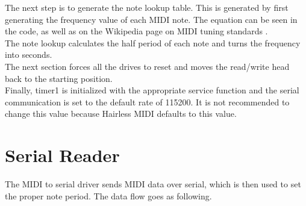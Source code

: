 \documentclass[11pt, a4paper]{report}
\begin{document}


The next step is to generate the note lookup table. This is generated by first generating the frequency value of each MIDI note. The equation can be seen in the code, as well as on the Wikipedia page on MIDI tuning standards \cite{MIDIStandard}.  \\




The note lookup calculates the half period of each note and turns the frequency into seconds. \\



The next section forces all the drives to reset and moves the read/write head back to the starting position. \\



Finally, timer1 is initialized with the appropriate service function and the serial communication is set to the default rate of 115200. It is not recommended to change this value because Hairless MIDI defaults to this value. \\ 



\section{Serial Reader}

The MIDI to serial driver sends MIDI data over serial, which is then used to set the proper note period. The data flow goes as following. \\
\begin{center}
\end{center}
\end{document}
